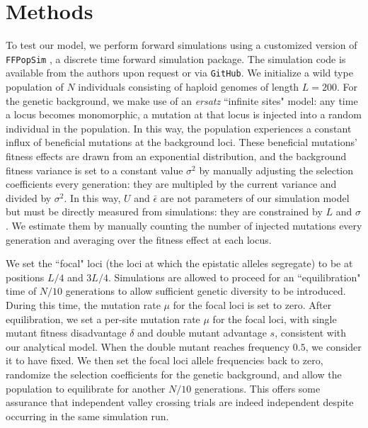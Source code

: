 \documentclass[rmp]{revtex4}
\begin{document}
\section*{Methods}

To test our model, we perform forward simulations using a customized version of \texttt{FFPopSim} \citep{zanini_2012}, a discrete time forward simulation package.
The simulation code is available from the authors upon request or via \texttt{GitHub}.
We initialize a wild type population of $N$ individuals consisting of haploid genomes of length $L = 200$.
For the genetic background, we make use of an \emph{ersatz} ``infinite sites" model: any time a locus becomes monomorphic, a mutation at that locus is injected into a random individual in the population.
In this way, the population experiences a constant influx of beneficial mutations at the background loci.
These beneficial mutations' fitness effects are drawn from an exponential distribution, and the background fitness variance is set to a constant value $\sigma^2$ by manually adjusting the selection coefficients every generation: they are multipled by the current variance and divided by $\sigma^2$.
In this way, $U$ and $\bar{\epsilon}$ are not parameters of our simulation model but must be directly measured from simulations: they are constrained by $L$ and $\sigma$.
We estimate them by manually counting the number of injected mutations every generation and averaging over the fitness effect at each locus.

We set the ``focal" loci (the loci at which the epistatic alleles segregate) to be at positions $L/4$ and $3L/4$.
Simulations are allowed to proceed for an ``equilibration" time of $N/10$ generations to allow sufficient genetic diversity to be introduced.
During this time, the mutation rate $\mu$ for the focal loci is set to zero.
After equilibration, we set a per-site mutation rate $\mu$ for the focal loci, with single mutant fitness disadvantage $\delta$ and double mutant advantage $s$, consistent with our analytical model.
When the double mutant reaches frequency $0.5$, we consider it to have fixed.
We then set the focal loci allele frequencies back to zero, randomize the selection coefficients for the genetic background, and allow the population to equilibrate for another $N/10$ generations.
This offers some assurance that independent valley crossing trials are indeed independent despite occurring in the same simulation run.
\end{document}
